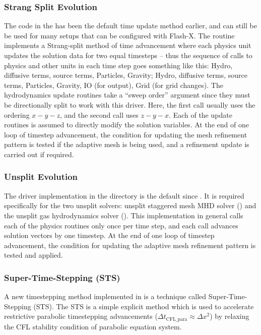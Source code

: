 \subsubsection{Strang Split Evolution}
The code in the  \uid has been the default
time update method earlier, and can still be be used for
many setups that can be configured with
Flash-X.  The routine   implements a
Strang-split method of time advancement where each physics unit
updates the solution data for two equal timesteps -- thus the sequence
of calls to physics and other units in each time step goes something like this: 
\unit{Hydro}, diffusive terms, source terms, \unit{Particles}, \unit{Gravity};
\unit{Hydro}, diffusive terms, source terms, \unit{Particles}, \unit{Gravity}, 
\unit{IO} (for output), \unit{Grid} (for grid changes).
The
hydrodynamics update routines take a ``sweep order'' argument since
they must be directionally split to work with this driver. Here, the
first call usually uses the ordering $x-y-z$, and the second call uses
$z-y-x$. Each of the update routines is assumed to directly modify the
solution variables. At the end of one loop of timestep advancement,
the condition for updating the mesh refinement pattern is tested if
the adaptive mesh is being used, and a refinement update is carried
out if required.

\subsubsection{Unsplit Evolution}
The driver implementation in the  directory is
the default since \flashx. 
It is required
specifically for the two unsplit solvers:
unsplit staggered mesh MHD solver () and the unsplit 
gas hydrodynamics solver ().
This implementation in general calls each of the physics routines only once 
per time step, and
each call advances solution vectors by one timestep.
At the end of one loop of timestep advancement, the condition for updating the 
adaptive mesh refinement pattern is tested and applied.


\subsubsection{Super-Time-Stepping (STS)}
A new timestepping method implemented in \flashx is a technique called
Super-Time-Stepping (STS). The STS is a simple explicit method which is
used to accelerate restrictive parabolic timestepping advancements ($\Delta t_{\mbox{CFL\_para}}\approx \Delta x^2$)
by relaxing the CFL stability condition of parabolic equation system.

